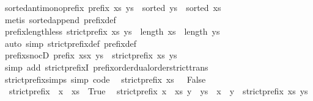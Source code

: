 \begin{isabellebody}
\ sorted{\isacharunderscore}antimono{\isacharunderscore}prefix{\isacharcolon}\ {\isachardoublequoteopen}prefix\ xs\ ys\ {\isasymLongrightarrow}\ sorted\ ys\ {\isasymLongrightarrow}\ sorted\ xs{\isachardoublequoteclose}\isanewline
%
\isadelimproof
%
\endisadelimproof
%
\isatagproof
{}\isamarkupfalse%
\ {\isacharparenleft}metis\ sorted{\isacharunderscore}append\ prefix{\isacharunderscore}def{\isacharparenright}%
\endisatagproof
{\isafoldproof}%
%
\isadelimproof
\isanewline
%
\endisadelimproof
\isanewline
{}\isamarkupfalse%
\ prefix{\isacharunderscore}length{\isacharunderscore}less{\isacharcolon}\ {\isachardoublequoteopen}strict{\isacharunderscore}prefix\ xs\ ys\ {\isasymLongrightarrow}\ length\ xs\ {\isacharless}\ length\ ys{\isachardoublequoteclose}\isanewline
%
\isadelimproof
\ \ %
\endisadelimproof
%
\isatagproof
{}\isamarkupfalse%
\ {\isacharparenleft}auto\ simp{\isacharcolon}\ strict{\isacharunderscore}prefix{\isacharunderscore}def\ prefix{\isacharunderscore}def{\isacharparenright}%
\endisatagproof
{\isafoldproof}%
%
\isadelimproof
\isanewline
%
\endisadelimproof
\isanewline
{}\isamarkupfalse%
\ prefix{\isacharunderscore}snocD{\isacharcolon}\ {\isachardoublequoteopen}prefix\ {\isacharparenleft}xs{\isacharat}{\isacharbrackleft}x{\isacharbrackright}{\isacharparenright}\ ys\ {\isasymLongrightarrow}\ strict{\isacharunderscore}prefix\ xs\ ys{\isachardoublequoteclose}\isanewline
%
\isadelimproof
\ \ %
\endisadelimproof
%
\isatagproof
{}\isamarkupfalse%
\ {\isacharparenleft}simp\ add{\isacharcolon}\ strict{\isacharunderscore}prefixI{\isacharprime}\ prefix{\isacharunderscore}order{\isachardot}dual{\isacharunderscore}order{\isachardot}strict{\isacharunderscore}trans{}{\isacharparenright}%
\endisatagproof
{\isafoldproof}%
%
\isadelimproof
\isanewline
%
\endisadelimproof
\isanewline
{}\isamarkupfalse%
\ strict{\isacharunderscore}prefix{\isacharunderscore}simps\ {\isacharbrackleft}simp{\isacharcomma}\ code{\isacharbrackright}{\isacharcolon}\isanewline
\ \ {\isachardoublequoteopen}strict{\isacharunderscore}prefix\ xs\ {\isacharbrackleft}{\isacharbrackright}\ {\isasymlongleftrightarrow}\ False{\isachardoublequoteclose}\isanewline
\ \ {\isachardoublequoteopen}strict{\isacharunderscore}prefix\ {\isacharbrackleft}{\isacharbrackright}\ {\isacharparenleft}x\ {\isacharhash}\ xs{\isacharparenright}\ {\isasymlongleftrightarrow}\ True{\isachardoublequoteclose}\isanewline
\ \ {\isachardoublequoteopen}strict{\isacharunderscore}prefix\ {\isacharparenleft}x\ {\isacharhash}\ xs{\isacharparenright}\ {\isacharparenleft}y\ {\isacharhash}\ ys{\isacharparenright}\ {\isasymlongleftrightarrow}\ x\ {\isacharequal}\ y\ {\isasymand}\ strict{\isacharunderscore}prefix\ xs\ ys{\isachardoublequoteclose}\isanewline

\end{isabellebody}
